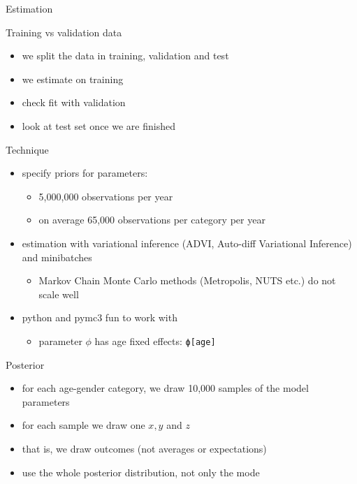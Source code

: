 \documentclass[presentation]{beamer}
\begin{document}
\begin{frame}[label={sec:org025e19e},fragile]{Estimation}
\begin{block}{Training vs validation data}
\begin{itemize}
\item we split the data in training, validation and test
\item we estimate on training
\item check fit with validation
\item look at test set once we are finished
\end{itemize}
\end{block}

\begin{block}{Technique}
\begin{itemize}
\item specify priors for parameters:
\begin{itemize}
\item 5,000,000 observations per year
\item on average 65,000 observations per category per year
\end{itemize}
\item estimation with variational inference (ADVI, Auto-diff Variational Inference) and minibatches
\begin{itemize}
\item Markov Chain Monte Carlo methods (Metropolis, NUTS etc.) do not scale well
\end{itemize}
\item python and pymc3 fun to work with
\begin{itemize}
\item parameter \(\phi\) has age fixed effects: \texttt{ϕ[age]}
\end{itemize}
\end{itemize}
\end{block}

\begin{block}{Posterior}
\begin{itemize}
\item for each age-gender category, we draw 10,000 samples of the model parameters
\item for each sample we draw one \(x,y\) and \(z\)
\item that is, we draw outcomes (not averages or expectations)
\item use the whole posterior distribution, not only the mode
\end{itemize}
\end{block}


\end{frame}
\end{document}

